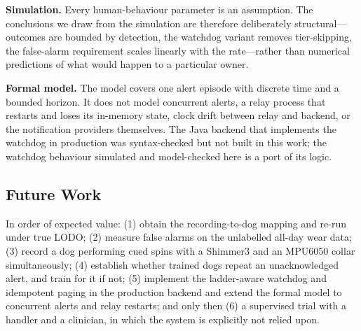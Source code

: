 \textbf{Simulation.} Every human-behaviour parameter is an assumption. The conclusions we draw from the simulation are therefore deliberately structural---outcomes are bounded by detection, the watchdog variant removes tier-skipping, the false-alarm requirement scales linearly with the rate---rather than numerical predictions of what would happen to a particular owner.

\textbf{Formal model.} The model covers one alert episode with discrete time and a bounded horizon. It does not model concurrent alerts, a relay process that restarts and loses its in-memory state, clock drift between relay and backend, or the notification providers themselves. The Java backend that implements the watchdog in production was syntax-checked but not built in this work; the watchdog behaviour simulated and model-checked here is a port of its logic.

\subsection{Future Work}
In order of expected value: (1) obtain the recording-to-dog mapping and re-run under true LODO; (2) measure false alarms on the unlabelled all-day wear data; (3) record a dog performing cued spins with a Shimmer3 and an MPU6050 collar simultaneously; (4) establish whether trained dogs repeat an unacknowledged alert, and train for it if not; (5) implement the ladder-aware watchdog and idempotent paging in the production backend and extend the formal model to concurrent alerts and relay restarts; and only then (6) a supervised trial with a handler and a clinician, in which the system is explicitly not relied upon.
